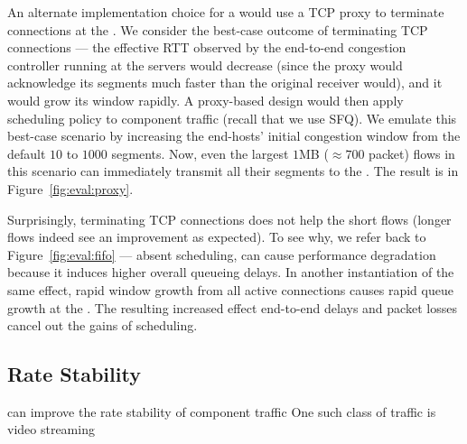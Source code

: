 An alternate implementation choice for a \name would use a TCP proxy to terminate connections at the \inbox. 
We consider the best-case outcome of terminating TCP connections --- the effective RTT observed by the end-to-end congestion controller running at the servers would decrease (since the proxy would acknowledge its segments much faster than the original receiver would), and it would grow its window rapidly.
A proxy-based design would then apply scheduling policy to component traffic (recall that we use SFQ).
We emulate this best-case scenario by increasing the end-hosts' initial congestion window from the default $10$ to $1000$ segments.
Now, even the largest $1$MB ($\approx700$ packet) flows in this scenario can immediately transmit all their segments to the \inbox.
The result is in Figure~\ref{fig:eval:proxy}.



Surprisingly, terminating TCP connections does not help the short flows (longer flows indeed see an improvement as expected). 
To see why, we refer back to Figure~\ref{fig:eval:fifo} --- absent scheduling, \name can cause performance degradation because it induces higher overall queueing delays.
In another instantiation of the same effect, rapid window growth from all active connections causes rapid queue growth at the \inbox. The resulting increased effect end-to-end delays and packet losses cancel out the gains of scheduling. 

\subsection{Rate Stability}\label{s:eval:ratestable}

\begin{outline}
    \1 \name can improve the rate stability of component traffic
    \1 One such class of traffic is video streaming
\end{outline}
